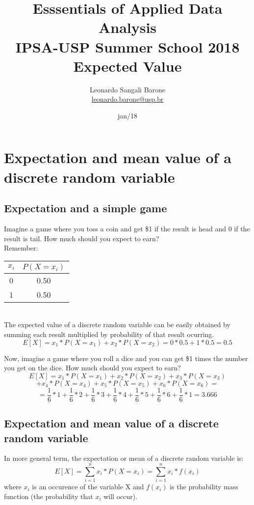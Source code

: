 \documentclass[11pt]{article}
\title{\textbf{Esssentials of Applied Data Analysis\\
				IPSA-USP Summer School 2018}\newline\\
				Expected Value}
\author{Leonardo Sangali Barone\\ \href{leonardo.barone@usp.br}{leonardo.barone@usp.br}}
\date{jan/18}
\begin{document}
\maketitle

\section*{Expectation and mean value of a discrete random variable}


	\subsection*{Expectation and a simple game}

	Imagine a game where you toss a coin and get \$1 if the result is head and 0 if the result is tail. How much should you expect to earn?\\

	Remember:
	
\begin{tabular}{|c|c|}
\hline
	$x_i$ & $P(X = x_i)$\\
\hline
	0 & 0.50\\
	1 & 0.50\\
\hline
\end{tabular}\\


	The expected value of a discrete random variable can be easily obtained by summing each result multiplied by probability of that result ocurring.
	\[E[X] = x_1 * P(X = x_1) + x_2 * P(X = x_2) = 0* 0.5 + 1 * 0.5 = 0.5\]
	


	Now, imagine a game where you roll a dice and you can get \$1 times the number you get on the dice. How much should you expect to earn?\\

\[ E[X] = x_1 * P(X = x_1) + x_2 * P(X = x_2) + x_3 * P(X = x_3) \]
\[+ x_4 * P(X = x_4) + x_5 * P(X = x_5) + x_6 * P(X = x_6) = \]
\[ = \frac{1}{6} * 1 + \frac{1}{6} * 2 + \frac{1}{6} * 3 + \frac{1}{6} * 4 + \frac{1}{6} * 5 + \frac{1}{6} * 6 + \frac{1}{6} * 1 = 3.666 \]

	\subsection*{Expectation and mean value of a discrete random variable}

	In more general term, the expectation or mean of a discrete random variable is:
	\[E[X] = \sum\limits_{i=1}^n x_i * P(X = x_i) = \sum\limits_{i=1}^n x_i * f(x_i)\]
where $x_i$ is an occurence of the variable X and $f(x_i)$ is the probability mass function (the probability that $x_i$ will occur).\\
\end{document}
